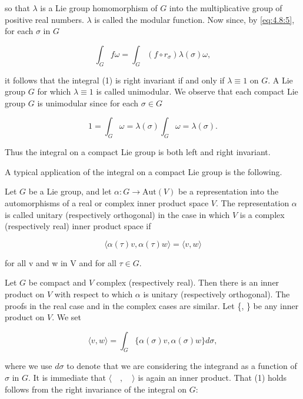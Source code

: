 so that $\lambda$ is a Lie group homomorphism of $G$ into the multiplicative group of positive real numbers. $\lambda$ is called the modular function. Now since, by \eqref{eq:4.8:5}, for each $\sigma$ in $G$ 

\[
\int_{G}f\omega=\int_{G}(f\circ r_{\sigma})\lambda(\sigma)\omega,
\]

it follows that the integral (1) is right invariant if and only if $\lambda \equiv 1$ on $G$. A Lie group $G$ for which $\lambda \equiv 1$ is called unimodular. We observe that each compact Lie group $G$ is unimodular since for each $\sigma \in G$

\[
1=\int_{G}\omega=\lambda(\sigma)\int_{G}\omega=\lambda(\sigma).
\]

Thus the integral on a compact Lie group is both left and right invariant.

\label{thm:4.12}
A typical application of the integral on a compact Lie group is the following.

Let $G$ be a Lie group, and let $\alpha: G \to \mathrm{Aut}(V)$ be a representation into the automorphisms of a real or complex inner product space $V$. The representation $\alpha$ is called unitary (respectively orthogonal) in the case in which $V$ is a complex (respectively real) inner product space if

\begin{equation}
\tag{1}\label{eq:4.12:1}
\langle\alpha(\tau)v,\alpha(\tau)w\rangle=\langle v,w\rangle
\end{equation}

for all v and w in V and for all  $ \tau \in G $.

Let $G$ be compact and $V$ complex (respectively real). Then there is an inner product on $V$ with respect to which $\alpha$ is unitary (respectively orthogonal). The proofs in the real case and in the complex cases are similar. Let \{, \} be any inner product on $V$. We set

\begin{equation}
\tag{2}\label{eq:4.12:2}
\langle v,w\rangle=\int_{G}\{\alpha(\sigma)v,\alpha(\sigma)w\}d\sigma,
\end{equation}

where we use $d\sigma$ to denote that we are considering the integrand as a function of $\sigma$ in $G$. It is immediate that $\langle\quad,\quad\rangle$ is again an inner product. That (1) holds follows from the right invariance of the integral on $G$:


